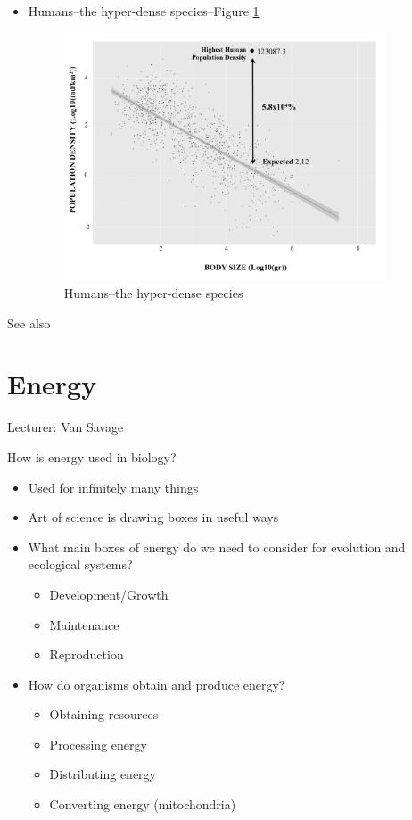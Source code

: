 \documentclass[]{article}
\begin{document}
\begin{itemize}
\begin{figure}[H]
	\end{figure}
	\item Humans--the hyper-dense species--Figure \ref{fig:Hyperdense}
	\begin{figure}[H]
		\caption{Humans--the hyper-dense species}\label{fig:Hyperdense}
		\includegraphics[width=0.9\textwidth]{Hyperdense}
	\end{figure}
\end{itemize}

See also \cite{marquet2005scaling}

\section{Energy}

Lecturer: Van Savage

How is energy used in biology?

\begin{itemize}
	\item Used for infinitely many things
	\item Art of science is drawing boxes in useful ways
	\item What main boxes of energy do we need to consider for evolution and	ecological systems?
	\begin{itemize}
		\item Development/Growth
		\item Maintenance
		\item Reproduction
	\end{itemize}
	\item How do organisms obtain and produce energy?
	\begin{itemize}
		\item Obtaining resources
		\item Processing energy
		\item Distributing energy
		\item Converting energy (mitochondria)
	\end{itemize}
\end{itemize}
\end{document}
